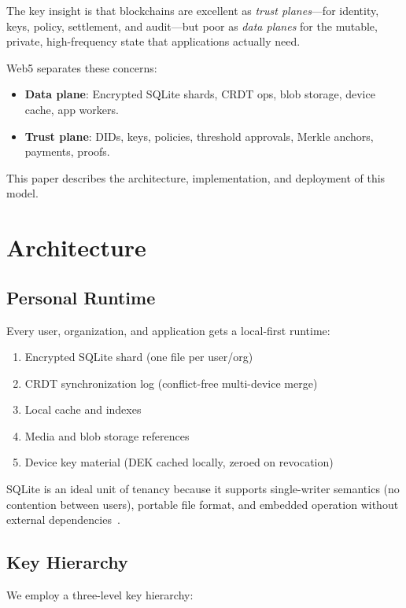 \documentclass[twocolumn,11pt]{article}
\begin{document}
The key insight is that blockchains are excellent as \textit{trust planes}---for identity, keys, policy, settlement, and audit---but poor as \textit{data planes} for the mutable, private, high-frequency state that applications actually need.

Web5 separates these concerns:

\begin{itemize}
\item \textbf{Data plane}: Encrypted SQLite shards, CRDT ops, blob storage, device cache, app workers.
\item \textbf{Trust plane}: DIDs, keys, policies, threshold approvals, Merkle anchors, payments, proofs.
\end{itemize}

This paper describes the architecture, implementation, and deployment of this model.

\section{Architecture}

\subsection{Personal Runtime}

Every user, organization, and application gets a local-first runtime:

\begin{enumerate}
\item Encrypted SQLite shard (one file per user/org)
\item CRDT synchronization log (conflict-free multi-device merge)
\item Local cache and indexes
\item Media and blob storage references
\item Device key material (DEK cached locally, zeroed on revocation)
\end{enumerate}

SQLite is an ideal unit of tenancy because it supports single-writer semantics (no contention between users), portable file format, and embedded operation without external dependencies~\cite{sqlite2020}.

\subsection{Key Hierarchy}

We employ a three-level key hierarchy:
\end{document}
